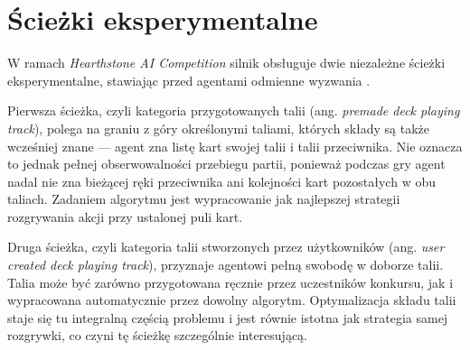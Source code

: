\section{Ścieżki eksperymentalne}

W ramach \textit{Hearthstone AI Competition} silnik obsługuje dwie niezależne ścieżki eksperymentalne, stawiając przed agentami odmienne wyzwania \cite{hearthstone_competition}.

Pierwsza ścieżka, czyli kategoria przygotowanych talii (ang. \textit{premade deck playing track}), polega na graniu z góry określonymi taliami, których składy są także wcześniej znane --- agent zna listę kart swojej talii i talii przeciwnika. Nie oznacza to jednak pełnej obserwowalności przebiegu partii, ponieważ podczas gry agent nadal nie zna bieżącej ręki przeciwnika ani kolejności kart pozostałych w obu taliach. Zadaniem algorytmu jest wypracowanie jak najlepszej strategii rozgrywania akcji przy ustalonej puli kart.

Druga ścieżka, czyli kategoria talii stworzonych przez użytkowników (ang. \textit{user created deck playing track}), przyznaje agentowi pełną swobodę w doborze talii. Talia może być zarówno przygotowana ręcznie przez uczestników konkursu, jak i wypracowana automatycznie przez dowolny algorytm. Optymalizacja składu talii staje się tu integralną częścią problemu i jest równie istotna jak strategia samej rozgrywki, co czyni tę ścieżkę szczególnie interesującą.
